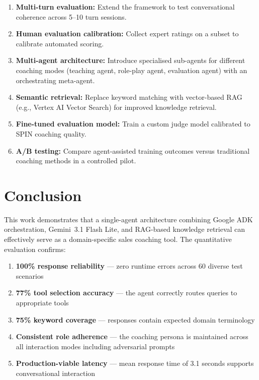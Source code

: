 \documentclass[10pt,twocolumn,a4paper]{article}
\begin{document}
\begin{enumerate}[leftmargin=*,noitemsep,topsep=2pt]
    \item \textbf{Multi-turn evaluation:} Extend the framework to test conversational coherence across 5--10 turn sessions.
    \item \textbf{Human evaluation calibration:} Collect expert ratings on a subset to calibrate automated scoring.
    \item \textbf{Multi-agent architecture:} Introduce specialised sub-agents for different coaching modes (teaching agent, role-play agent, evaluation agent) with an orchestrating meta-agent.
    \item \textbf{Semantic retrieval:} Replace keyword matching with vector-based RAG (e.g., Vertex AI Vector Search) for improved knowledge retrieval.
    \item \textbf{Fine-tuned evaluation model:} Train a custom judge model calibrated to SPIN coaching quality.
    \item \textbf{A/B testing:} Compare agent-assisted training outcomes versus traditional coaching methods in a controlled pilot.
\end{enumerate}

\section{Conclusion}
\label{sec:conclusion}

This work demonstrates that a single-agent architecture combining Google ADK orchestration, Gemini~3.1 Flash Lite, and RAG-based knowledge retrieval can effectively serve as a domain-specific sales coaching tool. The quantitative evaluation confirms:

\begin{enumerate}[leftmargin=*,noitemsep,topsep=2pt]
    \item \textbf{100\% response reliability} --- zero runtime errors across 60 diverse test scenarios
    \item \textbf{77\% tool selection accuracy} --- the agent correctly routes queries to appropriate tools
    \item \textbf{75\% keyword coverage} --- responses contain expected domain terminology
    \item \textbf{Consistent role adherence} --- the coaching persona is maintained across all interaction modes including adversarial prompts
    \item \textbf{Production-viable latency} --- mean response time of 3.1 seconds supports conversational interaction
\end{enumerate}
\end{document}
